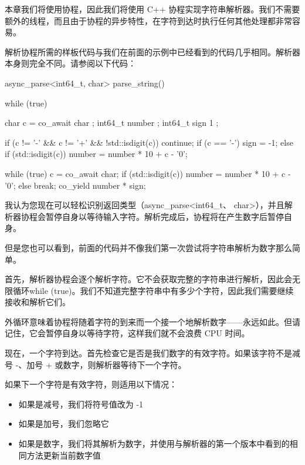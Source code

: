 
本章我们将使用协程，因此我们将使用 C++ 协程实现字符串解析器。我们不需要额外的线程，而且由于协程的异步特性，在字符到达时执行任何其他处理都非常容易。

解析协程所需的样板代码与我们在前面的示例中已经看到的代码几乎相同。解析器本身则完全不同。请参阅以下代码：

\begin{cpp}
async_parse<int64_t, char> parse_string() {
    while (true) {
        char c = co_await char{ };
        int64_t number { };
        int64_t sign { 1 };

        if (c != '-' && c != '+' && !std::isdigit(c)) {
            continue;
        }
        if (c == '-') {
            sign = -1;
        }
        else if (std::isdigit(c)) {
            number = number * 10 + c - '0';
        }

        while (true) {
            c = co_await char{};
            if (std::isdigit(c)) {
                number = number * 10 + c - '0';
            }
            else {
                break;
            }
        }
        co_yield number * sign;
    }
}
\end{cpp}

我认为您现在可以轻松识别返回类型（async\_parse<int64\_t、 char>），并且解析器协程会暂停自身以等待输入字符。解析完成后，协程将在产生数字后暂停自身。

但是您也可以看到，前面的代码并不像我们第一次尝试将字符串解析为数字那么简单。

首先，解析器协程会逐个解析字符。它不会获取完整的字符串进行解析，因此会无限循环while (true)。我们不知道完整字符串中有多少个字符，因此我们需要继续接收和解析它们。

外循环意味着协程将随着字符的到来而一个接一个地解析数字——永远如此。但请记住，它会暂停自身以等待字符，这样我们就不会浪费 CPU 时间。

现在，一个字符到达。首先检查它是否是我们数字的有效字符。如果该字符不是减号 -、加号 + 或数字，则解析器等待下一个字符。

如果下一个字符是有效字符，则适用以下情况：

\begin{itemize}
\item
如果是减号，我们将符号值改为 -1

\item
如果是加号，我们忽略它

\item
如果是数字，我们将其解析为数字，并使用与解析器的第一个版本中看到的相同方法更新当前数字值
\end{itemize}


